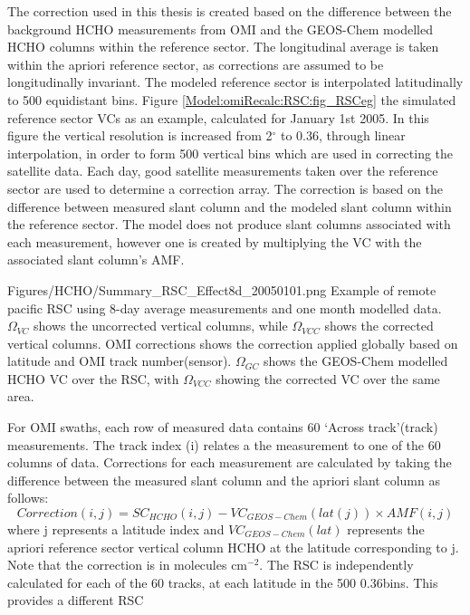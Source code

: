     The correction used in this thesis is created based on the difference between the background HCHO measurements from OMI and the GEOS-Chem modelled HCHO columns within the reference sector.
    The longitudinal average is taken within the apriori reference sector, as corrections are assumed to be longitudinally invariant.
    The modeled reference sector is interpolated latitudinally to 500 equidistant bins.
    Figure \ref{Model:omiRecalc:RSC:fig_RSCeg} the simulated reference sector VCs as an example, calculated for January 1st 2005.
    In this figure the vertical resolution is increased from 2$^{\circ}$ to 0.36\degr, through linear interpolation, in order to form 500 vertical bins which are used in correcting the satellite data.
    Each day, good satellite measurements taken over the reference sector are used to determine a correction array.
    The correction is based on the difference between measured slant column and the modeled slant column within the reference sector.
    The model does not produce slant columns associated with each measurement, however one is created by multiplying the VC with the associated slant column's AMF.
    
    {Figures/HCHO/Summary_RSC_Effect8d_20050101.png}
    {%
      Example of remote pacific RSC using 8-day average measurements and one month modelled data.
      $\Omega_{VC}$ shows the uncorrected vertical columns, while $\Omega_{VCC}$ shows the corrected vertical columns.
      OMI corrections shows the correction applied globally based on latitude and OMI track number(sensor).
      $\Omega_{GC}$ shows the GEOS-Chem modelled HCHO VC over the RSC, with $\Omega_{VCC}$ showing the corrected VC over the same area.
    }
    {\label{Model:omiRecalc:RSC:fig_RSCeg}}
    
    For OMI swaths, each row of measured data contains 60 `Across track'(track) measurements.
    The track index (i) relates a the measurement to one of the 60 columns of data.
    Corrections for each measurement are calculated by taking the difference between the measured slant column and the apriori slant column as follows:
    \begin{equation} \label{Model:omiRecalc:eqn_RSC}
      Correction(i,j) = SC_{HCHO}(i,j) - VC_{GEOS-Chem}(lat(j)) \times {AMF}(i,j)
    \end{equation}
    where j represents a latitude index and $VC_{GEOS-Chem}(lat)$ represents the apriori reference sector vertical column HCHO at the latitude corresponding to j.
    Note that the correction is in molecules cm$^{-2}$.
    The RSC is independently calculated for each of the 60 tracks, at each latitude in the 500 0.36\degr bins.
    This provides a different RSC 
    
